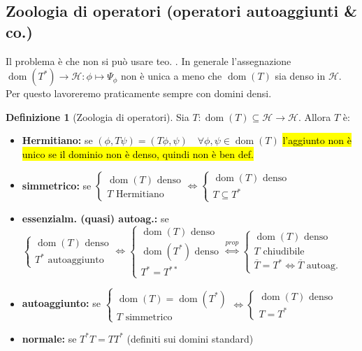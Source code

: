 \documentclass[a4paper,10pt]{article}
\theoremstyle{definition}
\DeclareMathOperator*{\dom}{dom} %
\newcommand{\hil}{\mathcal{H}} %
\theoremstyle{indentdefinition}
\newtheorem{defn}{Definizione}[section]
\theoremstyle{indenttheorem}
\theoremstyle{myremark}
\theoremstyle{indentgeneral}
\begin{document}
\subsection{Zoologia di operatori (operatori autoaggiunti \& co.)}
Il problema è che non si può usare teo. . In generale l'assegnazione $\dom(T^*)\to\hil:\phi\mapsto\Psi_\phi$ non è unica a meno che $\dom(T)$ sia denso in $\hil$. Per questo lavoreremo praticamente sempre con domini densi.
\begin{defn}[Zoologia di operatori]
     Sia $T:\dom(T)\subseteq\hil\to \hil$. Allora $T$ è:
     \begin{itemize}
         \item \textbf{Hermitiano:} se $(\phi,T\psi)=(T\phi,\psi)\quad \forall\phi,\psi\in\dom(T)$ \hl{l'aggiunto non è unico se il dominio non è denso, quindi non è ben def.}
         \item \textbf{simmetrico:} se $\begin{cases}
             \dom(T) \text{ denso}\\
             T\text{ Hermitiano}
         \end{cases}\iff \begin{cases}
             \dom(T) \text{ denso}\\
             T\subseteq T^*
         \end{cases}$
         \item \textbf{essenzialm. (quasi) autoag.:} se $ \begin{cases}
             \dom(T) \text{ denso}\\
             T^*\text{ autoaggiunto}
         \end{cases}\iff\begin{cases}
             \dom(T) \text{ denso}\\
             \dom(T^*) \text{ denso}\\
             T^*=T^{**}
         \end{cases}\overset{prop}{\iff}\begin{cases}
             \dom(T) \text{ denso}\\
             T\text{ chiudibile}\\
             \overline{T}=T^*\iff \overline{T} \text{ autoag.}
         \end{cases}$
         \item \textbf{autoaggiunto:} se $\begin{cases}
             \dom(T)=\dom(T^*)\\
             T\text{ simmetrico}
         \end{cases}\iff\begin{cases}
             \dom(T) \text{ denso}\\
             T=T^*
         \end{cases}$
         
         \item \textbf{normale:} se $T^*T=TT^*$ (definiti sui domini standard)
     \end{itemize}
\end{defn}
\end{document}
